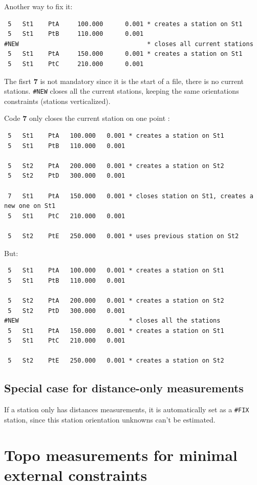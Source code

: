Another way to fix it:
\begin{verbatim}
 5   St1    PtA     100.000      0.001 * creates a station on St1
 5   St1    PtB     110.000      0.001
#NEW                                   * closes all current stations
 5   St1    PtA     150.000      0.001 * creates a station on St1
 5   St1    PtC     210.000      0.001
\end{verbatim}
The fisrt \textbf{7} is not mandatory since it is the start of a file, there is no
current stations. \texttt{\#NEW} closes all the current stations, keeping the same orientations constraints (stations verticalized).

Code \textbf{7} only closes the current station on one point :
\begin{verbatim}
 5   St1    PtA   100.000   0.001 * creates a station on St1
 5   St1    PtB   110.000   0.001
 
 5   St2    PtA   200.000   0.001 * creates a station on St2
 5   St2    PtD   300.000   0.001

 7   St1    PtA   150.000   0.001 * closes station on St1, creates a new one on St1
 5   St1    PtC   210.000   0.001

 5   St2    PtE   250.000   0.001 * uses previous station on St2
\end{verbatim}
But:
\begin{verbatim}
 5   St1    PtA   100.000   0.001 * creates a station on St1
 5   St1    PtB   110.000   0.001
 
 5   St2    PtA   200.000   0.001 * creates a station on St2
 5   St2    PtD   300.000   0.001
#NEW                              * closes all the stations
 5   St1    PtA   150.000   0.001 * creates a station on St1
 5   St1    PtC   210.000   0.001

 5   St2    PtE   250.000   0.001 * creates a station on St2
\end{verbatim}


\subsection{Special case for distance-only measurements}

If a station only has distances measurements, it is automatically
set as a \texttt{\#FIX} station, since this station orientation unknowns
can't be estimated.


\section{Topo measurements for minimal external constraints}

